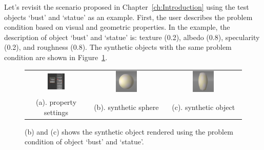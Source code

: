 Let's revisit the scenario proposed in Chapter~\ref{ch:Introduction} using the test objects `bust' and `statue' as an example. First, the user describes the problem condition based on visual and geometric properties. In the example, the description of object `bust' and `statue' is: texture (0.2), albedo (0.8), specularity (0.2), and roughness (0.8). The synthetic objects with the same problem condition are shown in Figure~\ref{fig:desc_interp_1}.
\begin{figure}[!htbp]
\centering
\begin{tabular}{ccc}
\includegraphics[width=0.3\textwidth]{img/interp/ui/interp_desc_0.JPG} &
\includegraphics[width=0.3\textwidth]{img/interp/ui/interp_desc_1.png} &
\includegraphics[width=0.3\textwidth]{img/interp/ui/interp_desc_2.png} \\
(a). property settings & (b). synthetic sphere & (c). synthetic object \\
\end{tabular}
\caption{(b) and (c) shows the synthetic object rendered using the problem condition of object `bust' and `statue'.}
\label{fig:desc_interp_1}
\end{figure}

